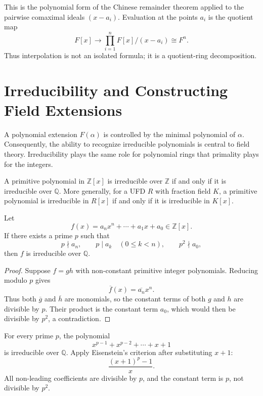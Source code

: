 \begin{remark}
This is the polynomial form of the Chinese remainder theorem applied to the pairwise comaximal ideals $(x-a_i)$. Evaluation at the points $a_i$ is the quotient map
\[
    F[x]\longrightarrow
    \prod_{i=1}^n F[x]/(x-a_i)
    \cong F^n.
\]
Thus interpolation is not an isolated formula; it is a quotient-ring decomposition.
\end{remark}

\section{Irreducibility and Constructing Field Extensions}

A polynomial extension $F(\alpha)$ is controlled by the minimal polynomial of $\alpha$. Consequently, the ability to recognize irreducible polynomials is central to field theory. Irreducibility plays the same role for polynomial rings that primality plays for the integers.

\begin{theorem}
A primitive polynomial in $\mathbb{Z}[x]$ is irreducible over $\mathbb{Z}$ if and only if it is irreducible over $\mathbb{Q}$. More generally, for a UFD $R$ with fraction field $K$, a primitive polynomial is irreducible in $R[x]$ if and only if it is irreducible in $K[x]$.
\end{theorem}

\begin{theorem}
Let
\[
    f(x)=a_nx^n+\cdots+a_1x+a_0\in\mathbb{Z}[x].
\]
If there exists a prime $p$ such that
\[
    p\nmid a_n,
    \qquad
    p\mid a_k\quad(0\leq k<n),
    \qquad
    p^2\nmid a_0,
\]
then $f$ is irreducible over $\mathbb{Q}$.
\end{theorem}

\begin{proof}
Suppose $f=gh$ with non-constant primitive integer polynomials. Reducing modulo $p$ gives
\[
    \overline{f}(x)=\overline{a_n}x^n.
\]
Thus both $\overline{g}$ and $\overline{h}$ are monomials, so the constant terms of both $g$ and $h$ are divisible by $p$. Their product is the constant term $a_0$, which would then be divisible by $p^2$, a contradiction.
\end{proof}

\begin{example}
For every prime $p$, the polynomial
\[
    x^{p-1}+x^{p-2}+\cdots+x+1
\]
is irreducible over $\mathbb{Q}$. Apply Eisenstein's criterion after substituting $x+1$:
\[
    \frac{(x+1)^p-1}{x}.
\]
All non-leading coefficients are divisible by $p$, and the constant term is $p$, not divisible by $p^2$.
\end{example}

